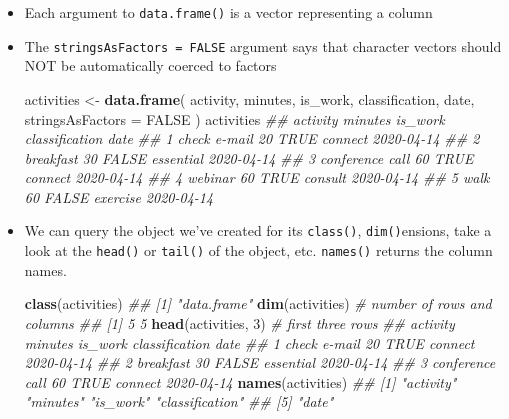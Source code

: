 \documentclass[]{book}
\newenvironment{Shaded}{\begin{snugshade}}{\end{snugshade}}
\newcommand{\CommentTok}[1]{\textcolor[rgb]{0.56,0.35,0.01}{\textit{#1}}}
\newcommand{\DataTypeTok}[1]{\textcolor[rgb]{0.13,0.29,0.53}{#1}}
\newcommand{\DecValTok}[1]{\textcolor[rgb]{0.00,0.00,0.81}{#1}}
\newcommand{\KeywordTok}[1]{\textcolor[rgb]{0.13,0.29,0.53}{\textbf{#1}}}
\newcommand{\NormalTok}[1]{#1}
\newcommand{\OtherTok}[1]{\textcolor[rgb]{0.56,0.35,0.01}{#1}}
\newcommand{\StringTok}[1]{\textcolor[rgb]{0.31,0.60,0.02}{#1}}
\begin{document}
\begin{itemize}
\item
  Each argument to \texttt{data.frame()} is a vector representing a column
\item
  The \texttt{stringsAsFactors\ =\ FALSE} argument says that character vectors should NOT be automatically coerced to factors

\begin{Shaded}
\begin{Highlighting}[]
\NormalTok{activities <-}\StringTok{ }\KeywordTok{data.frame}\NormalTok{(}
\NormalTok{    activity, minutes, is_work, classification, date,}
    \DataTypeTok{stringsAsFactors =} \OtherTok{FALSE}
\NormalTok{)}
\NormalTok{activities}
\CommentTok{##          activity minutes is_work classification       date}
\CommentTok{## 1    check e-mail      20    TRUE        connect 2020-04-14}
\CommentTok{## 2       breakfast      30   FALSE      essential 2020-04-14}
\CommentTok{## 3 conference call      60    TRUE        connect 2020-04-14}
\CommentTok{## 4         webinar      60    TRUE        consult 2020-04-14}
\CommentTok{## 5            walk      60   FALSE       exercise 2020-04-14}
\end{Highlighting}
\end{Shaded}
\item
  We can query the object we've created for its \texttt{class()}, \texttt{dim()}ensions, take a look at the \texttt{head()} or \texttt{tail()} of the object, etc. \texttt{names()} returns the column names.

\begin{Shaded}
\begin{Highlighting}[]
\KeywordTok{class}\NormalTok{(activities)}
\CommentTok{## [1] "data.frame"}
\KeywordTok{dim}\NormalTok{(activities)     }\CommentTok{# number of rows and columns}
\CommentTok{## [1] 5 5}
\KeywordTok{head}\NormalTok{(activities, }\DecValTok{3}\NormalTok{) }\CommentTok{# first three rows}
\CommentTok{##          activity minutes is_work classification       date}
\CommentTok{## 1    check e-mail      20    TRUE        connect 2020-04-14}
\CommentTok{## 2       breakfast      30   FALSE      essential 2020-04-14}
\CommentTok{## 3 conference call      60    TRUE        connect 2020-04-14}
\KeywordTok{names}\NormalTok{(activities)}
\CommentTok{## [1] "activity"       "minutes"        "is_work"        "classification"}
\CommentTok{## [5] "date"}
\end{Highlighting}
\end{Shaded}
\end{itemize}
\end{document}
